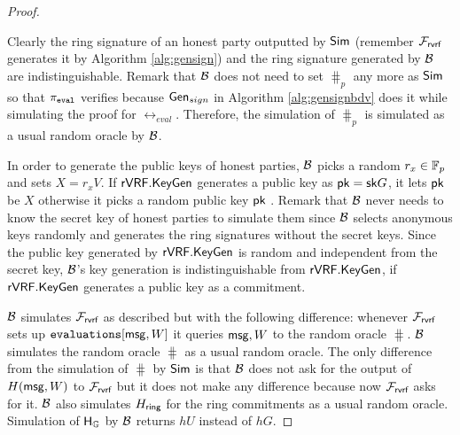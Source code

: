 \begin{proof}
\begin{algorithm}
	\end{algorithm}
	
	
	Clearly the ring signature of an honest party outputted by $ \mathsf{Sim} $ (remember $ \mathcal{F}_{\textsf{rvrf}}$ generates it by Algorithm \ref{alg:gensign}) and the ring signature generated by $ \mathcal{B} $ are indistinguishable. Remark that $ \mathcal{B} $ does not need to set $ \hash_p $ any more as $ \mathsf{Sim} $ so that $ \pi_{\mathtt{eval}} $ verifies because $ \mathsf{Gen}_{sign} $ in Algorithm \ref{alg:gensignbdv} does it while simulating the proof for $ \rel_{eval} $. Therefore, the simulation of $ \hash_p $ is simulated as a usual random oracle by $ \mathcal{B} $.
	
	In order to generate the public keys of honest parties, $ \mathcal{B} $ picks a random $ r_x\in \mathbb{F}_p $ and sets $ X =r_xV$. If $ {\mathsf{rVRF}}.{\mathsf{KeyGen}} $  generates a public key as $ \mathsf{pk} = \mathsf{sk} G $, it lets $ \mathsf{pk} $ be $ X $ otherwise it picks a random public key $ \mathsf{pk} $ .
	Remark that $ \mathcal{B}$  never needs to know the secret key of honest parties to simulate them since $ \mathcal{B} $ selects anonymous keys randomly  and generates the ring signatures  without the secret keys. Since the public key generated by $ {\mathsf{rVRF}}.{\mathsf{KeyGen}} $ is random and independent from the secret key, $ \mathcal{B} $'s key generation is indistinguishable from $ {\mathsf{rVRF}}.{\mathsf{KeyGen}} $, if ${\mathsf{rVRF}}.{\mathsf{KeyGen}} $  generates a public key as a commitment.
	
	
	$ \mathcal{B} $ simulates $ \mathcal{F}_{\textsf{rvrf}} $ as described but with the following difference: whenever $ \mathcal{F}_{\textsf{rvrf}} $ sets up $ \texttt{evaluations}[\mathsf{msg},W] $ it queries $ \mathsf{msg},W $ to the random oracle $ \hash $. $ \mathcal{B} $ simulates the random oracle $ \hash $  as a usual random oracle.
	The only difference from the simulation of $ \hash $ by $ \mathsf{Sim} $ is that $ \mathcal{B} $ does not ask for the output of $ H(\mathsf{msg},W) $ to $ \mathcal{F}_{\textsf{rvrf}} $ but it does not make any difference because now $\mathcal{F}_{\textsf{rvrf}} $ asks for it.  
	$ \mathcal{B} $ also simulates $ H_\mathsf{ring} $ for the ring commitments as a usual random oracle. 			
	Simulation of $ {\mathsf{H}}_{{\mathbb{G}}} $ by $ \mathcal{B} $ returns $ hU $ instead of $ hG $. 
	

\end{proof}
